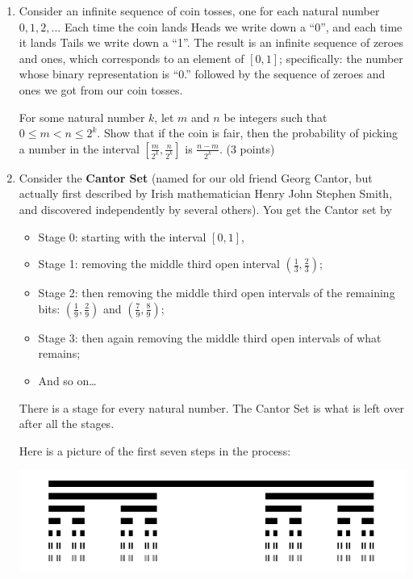 \documentclass[12pt,a4paper]{article}
\begin{document}
\begin{enumerate}

\item  Consider an infinite sequence of coin tosses, one for each natural number $0, 1, 2,\ldots$ Each time the coin lands Heads we write down a ``0'', and each time it lands Tails
we write down a ``1''. The result is an infinite sequence of zeroes and ones, which corresponds to an element of $[0, 1]$; specifically: the number whose binary representation is ``0.'' followed by the sequence of zeroes and ones we got from our coin tosses.

For some natural number $k$, let $m$ and $n$ be integers such that $0 \le m < n \le 2^k$. Show that if the coin is fair, then the probability of picking a number in the interval $[\frac{m}{2^k}, \frac{n}{2^k}]$ is $\frac{n-m}{2^k}$. (3 points)
	
\item Consider the \textbf{Cantor Set} (named for our old friend Georg Cantor, but actually first described by Irish mathematician Henry John Stephen Smith, and discovered independently by several others). You get the Cantor set by 
\begin{itemize}
\item Stage 0: starting with the interval $[0,1]$, 
\item Stage 1: removing the middle third open interval $(\frac{1}{3},\frac{2}{3})$; 
\item Stage 2: then removing the middle third open intervals of the remaining bits: $(\frac{1}{9}, \frac{2}{9})$  and $(\frac{7}{9},\frac{8}{9})$;
\item Stage 3: then again removing the middle third open intervals of what remains; 
\item And so on\ldots
\end{itemize}

There is a stage for every natural number. The Cantor Set is what is left over after all the stages.

Here is a picture of the first seven steps in the process:

\includegraphics[scale=0.5]{755px-Cantor.png}


\end{enumerate}
\end{document}
